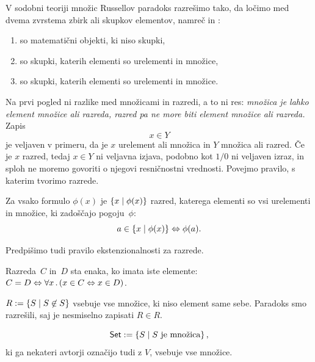 V sodobni teoriji množic Russellov paradoks razrešimo tako, da ločimo med dvema
zvrstema zbirk ali skupkov elementov, namreč  in :
%
\begin{enumerate}
\item {} so matematični objekti, ki niso skupki,
\item {} so skupki, katerih elementi so urelementi in množice,
\item {} so skupki, katerih elementi so urelementi in množice.
\end{enumerate}
%
Na prvi pogled ni razlike med množicami in razredi, a to ni res:
\emph{množica je lahko element množice ali razreda,
razred pa ne more biti element množice ali razreda.}
%
Zapis
%
\begin{equation*}
    x \in Y
\end{equation*}
%
je veljaven v primeru, da je $x$ urelement ali množica in $Y$ množica ali razred.
Če je $x$ razred, tedaj $x \in Y$ ni veljavna izjava, podobno kot $1/0$ ni veljaven izraz, in sploh ne moremo govoriti o njegovi resničnostni vrednosti.
%
Povejmo pravilo, s katerim tvorimo razrede.

\begin{pravilo}[Razredi]
  \label{pravilo:tvorba-razredov}
  Za vsako formulo $\phi(x)$ je $\left\{ x \; \middle| \; \phi(x) \right\}$ razred, katerega elementi
  so vsi urelementi in množice, ki zadoščajo pogoju~$\phi$:
  \begin{equation*}
    a \in \left\{ x \; \middle| \; \phi(x) \right\} \Leftrightarrow \phi(a).
  \end{equation*}
\end{pravilo}

\noindent
%
Predpišimo tudi pravilo ekstenzionalnosti za razrede.

\begin{pravilo}
  \label{pravilo:ekstenzionalnost-razredov}
  Razreda~$C$ in~$D$ sta enaka, ko imata iste elemente:
  $
    C = D \Leftrightarrow \forall x \,.\, (x \in C \Leftrightarrow x \in D)
  $.
\end{pravilo}

\begin{zgled}
   $R \mathrel{{:}{=}} \left\{ S \; \middle| \; S \not\in S \right\}$ vsebuje vse množice, ki niso element same sebe. Paradoks smo razrešili, saj je nesmiselno zapisati $R \in R$.
\end{zgled}

\begin{zgled}
  \begin{equation*}
    \mathsf{Set} \mathrel{{:}{=}} \left\{ S \; \middle| \; \text{$S$ je množica} \right\},
  \end{equation*}
  ki ga nekateri avtorji označijo tudi z $V$, vsebuje vse množice.
\end{zgled}

